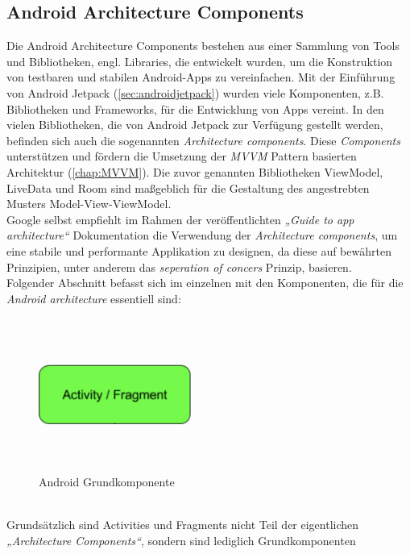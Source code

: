 \subsection{Android Architecture Components}
\label{chap:AAC}
Die Android Architecture Components bestehen aus einer Sammlung von Tools und Bibliotheken, engl. Libraries, die entwickelt wurden, um die 
Konstruktion von testbaren und stabilen Android-Apps zu vereinfachen. Mit der Einführung von Android Jetpack (\ref{sec:androidjetpack}) wurden 
viele Komponenten, z.B. Bibliotheken und Frameworks, für die Entwicklung von Apps vereint. In den vielen Bibliotheken, die von Android Jetpack 
zur Verfügung gestellt werden, befinden sich auch die sogenannten \textit{Architecture components}. Diese \textit{Components} unterstützen und 
fördern die Umsetzung der \textit{MVVM} Pattern basierten Architektur (\ref{chap:MVVM}). Die zuvor genannten Bibliotheken ViewModel, LiveData und Room 
sind maßgeblich für die Gestaltung des angestrebten Musters Model-View-ViewModel. 
\\ 
Google selbst empfiehlt im Rahmen der veröffentlichten \textit{„Guide to app architecture“} Dokumentation die Verwendung der \textit{Architecture components}, um 
eine stabile und performante Applikation zu designen, da diese auf bewährten Prinzipien, unter anderem das \textit{seperation of concers} Prinzip, basieren.
\\ 
\linebreak
Folgender Abschnitt befasst sich im einzelnen mit den Komponenten, die für die \textit{Android architecture} essentiell sind:
\begin{figure}[hbt!]
    \centering
    \includegraphics[width=5cm,height=5cm,keepaspectratio]{2GrundlagenX/Bilder/activityComp.png}
    \caption{Android Grundkomponente \cite{aac.2020j}}
    \label{pic:activity}
\end{figure}
\\
Grundsätzlich sind Activities und Fragments nicht Teil der eigentlichen \textit{„Architecture Components“}, sondern sind lediglich Grundkomponenten 
